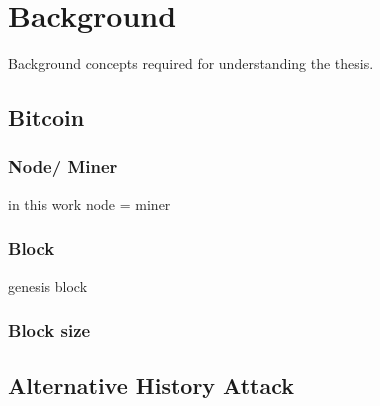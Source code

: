 \chapter{Background} 
\label{chapter:background}

Background concepts required for understanding the thesis. 

\section{Bitcoin}
\subsection{Node/ Miner}
in this work node = miner
\subsection{Block}
genesis block
\subsection{Block size}
\section{Alternative History Attack}
